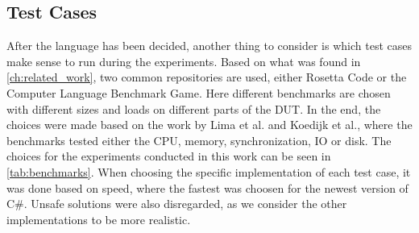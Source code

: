 \subsection{Test Cases}

After the language has been decided, another thing to consider is which test cases make sense to run during the experiments. Based on what was found in \cref{ch:related_work}, two common repositories are used, either Rosetta Code\cite[]{rosetta_code} or the Computer Language Benchmark Game\cite[]{benchmark_game}. Here different benchmarks are chosen with different sizes and loads on different parts of the DUT. In the end, the choices were made based on the work by Lima et al.\cite[]{greenland2016statistical} and Koedijk et al.\cite[]{Koedijk2022diff}, where the benchmarks tested either the CPU, memory, synchronization, IO or disk. The choices for the experiments conducted in this work can be seen in \cref{tab:benchmarks}. When choosing the specific implementation of each test case, it was done based on speed, where the fastest was choosen for the newest version of C\#. Unsafe solutions were also disregarded, as we consider the other implementations to be more realistic.


